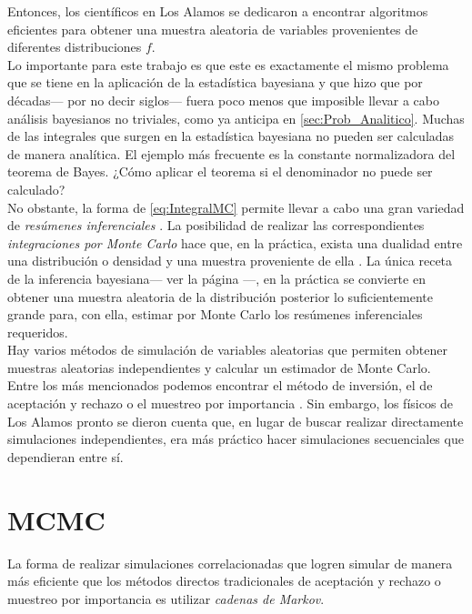 Entonces, los científicos en Los Alamos se dedicaron a encontrar algoritmos eficientes para obtener una muestra aleatoria de variables provenientes de diferentes distribuciones $f$.\\ 

Lo importante para este trabajo es que este es exactamente el mismo problema que se tiene en la aplicación de la estadística bayesiana y que hizo que por décadas--- por no decir siglos--- fuera poco menos que imposible llevar a cabo análisis bayesianos no triviales, como ya anticipa en \ref{sec:Prob_Analitico}. Muchas de las integrales que surgen en la estadística bayesiana no pueden ser calculadas de manera analítica. El ejemplo más frecuente es la constante normalizadora del teorema de Bayes. ¿Cómo aplicar el teorema si el denominador no puede ser calculado?\\ 

No obstante, la forma de \eqref{eq:IntegralMC} permite llevar a cabo una gran variedad de \textit{resúmenes inferenciales} \parencite{GP97}. La posibilidad de realizar las correspondientes \textit{integraciones por Monte Carlo} hace que, en la práctica, exista una dualidad entre una distribución o densidad y una muestra proveniente de ella \parencite{SmithGelfand92}. La única receta de la inferencia bayesiana--- ver la página \pageref{receta_bayesiana}---, en la práctica se convierte en obtener una muestra aleatoria de la distribución posterior lo suficientemente grande para, con ella, estimar por Monte Carlo los resúmenes inferenciales requeridos.\\

Hay varios métodos de simulación de variables aleatorias que permiten obtener muestras aleatorias independientes y calcular un estimador de Monte Carlo. Entre los más mencionados podemos encontrar el método de inversión, el de aceptación y rechazo o el muestreo por importancia \parencites{Ross13,RobertCasella10}. Sin embargo, los físicos de Los Alamos pronto se dieron cuenta que, en lugar de buscar realizar directamente simulaciones independientes, era más práctico hacer simulaciones secuenciales que dependieran entre sí. 

\section{MCMC}

La forma de realizar simulaciones correlacionadas que logren simular de manera más eficiente que los métodos directos tradicionales de aceptación y rechazo o muestreo por importancia es utilizar \textit{cadenas de Markov}.

